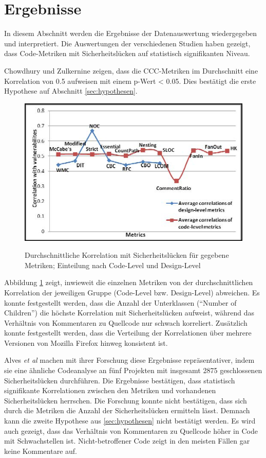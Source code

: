 \section{Ergebnisse}
\label{sec:ergebnisse}
In diesem Abschnitt werden die Ergebnisse der Datenauswertung wiedergegeben und interpretiert.
Die Auswertungen der verschiedenen Studien haben gezeigt, dass Code-Metriken mit Sicherheitslücken auf statistisch signifikanten Niveau\cite{chowdhury_zulkernine_2010,chowdhury_zulkernine_2009,alves_et_al}.

Chowdhury und Zulkernine \cite{chowdhury_zulkernine_2010} zeigen, dass die CCC-Metriken im Durchschnitt eine Korrelation von 0.5 aufweisen mit einem p-Wert < 0.05.
Dies bestätigt die erste Hypothese auf Abschnitt \ref{sec:hypothesen}.
\begin{figure}
	\includegraphics[width=\textwidth]{img/code_vs_design.png}
	\label{fig:code_vs_design}
	\caption{Durchschnittliche Korrelation mit Sicherheitslücken für gegebene Metriken; Einteilung nach Code-Level und Design-Level}
\end{figure}
Abbildung \ref{fig:code_vs_design} zeigt, inwieweit die einzelnen Metriken von der durchschnittlichen Korrelation der jeweiligen Gruppe (Code-Level bzw. Design-Level) abweichen.
Es konnte festgestellt werden, dass die Anzahl der Unterklassen ("`Number of Children"') die höchste Korrelation mit Sicherheitslücken aufweist, während das Verhältnis von Kommentaren zu Quellcode nur schwach korreliert.
Zusätzlich konnte festgestellt werden, dass die Verteilung der Korrelationen über mehrere Versionen von Mozilla Firefox hinweg konsistent ist.

Alves \emph{et al} \cite{alves_et_al} machen mit ihrer Forschung diese Ergebnisse repräsentativer, indem sie eine ähnliche Codeanalyse an fünf Projekten mit insgesamt 2875 geschlossenen Sicherheitslücken durchführen.
Die Ergebnisse bestätigen, dass statistisch signifikante Korrelationen zwischen den Metriken und vorhandenen Sicherheitslücken herrschen.
Die Forschung konnte nicht bestätigen, dass sich durch die Metriken die Anzahl der Sicherheitslücken ermitteln lässt.
Demnach kann die zweite Hypothese aus \ref{sec:hypothesen} nicht bestätigt werden.
Es wird auch gezeigt, dass das Verhältnis von Kommentaren zu Quellcode höher in Code mit Schwachstellen ist.
Nicht-betroffener Code zeigt in den meisten Fällen gar keine Kommentare auf.

